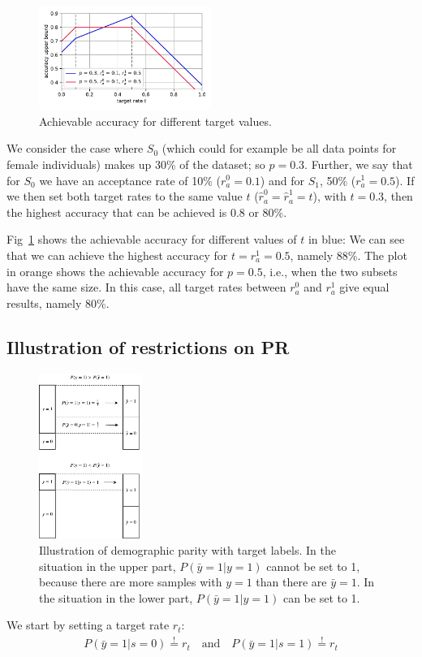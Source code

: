 \begin{figure}[t]
  \centering
  \includegraphics[width=0.5\textwidth]{./figures/plot.pdf}
  \caption{Achievable accuracy for different target values.}%
  \label{fig:accvstarget}
\end{figure}
\begin{example}
  We consider the case where $S_0$
  (which could for example be all data points for female individuals) makes up 30\% of the dataset; so $p = 0.3$.
  Further, we say that for $S_0$ we have an acceptance rate of 10\% ($r^0_a = 0.1$)
  and for $S_1$, 50\% ($r^1_a = 0.5$).
  If we then set both target rates to the same value $t$ ($\hat{r}^0_a=\hat{r}^1_a=t$), with $t = 0.3$,
  then the highest accuracy that can be achieved is $0.8$ or 80\%.

  Fig~\ref{fig:accvstarget} shows the achievable accuracy for different values of $t$ in blue:
  We can see that we can achieve the highest accuracy for $t=r^1_a=0.5$, namely 88\%.
  The plot in orange shows the achievable accuracy for $p=0.5$, i.e., when the two subsets have the same size.
  In this case, all target rates between $r^0_a$ and $r^1_a$ give equal results, namely 80\%.
\end{example}

\subsection{Illustration of restrictions on PR}
\begin{figure}[t]
  \centering
  \includegraphics[width=0.3\textwidth]{figures/label_shift.pdf}
  \caption{%
    Illustration of demographic parity with target labels.
    In the situation in the upper part, $P(\bar{y}=1|y=1)$ cannot be set to 1,
    because there are more samples with $y=1$ than there are $\bar{y}=1$.
    In the situation in the lower part, $P(\bar{y}=1|y=1)$ can be set to 1.
  }%
  \label{fig:shift}
\end{figure}%
We start by setting a target rate $r_t$:
\begin{align}
  P(\bar{y}=1|s=0) \overset{!}{=} r_t \quad\text{and}\quad P(\bar{y}=1|s=1) \overset{!}{=} r_t
\end{align}

